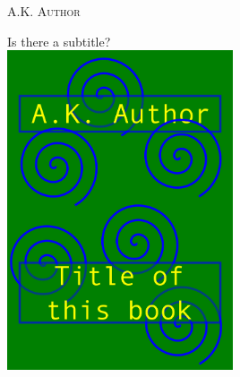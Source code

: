 \begin{titlepage}
	\centering
	\vspace*{1in}
	\LARGE{\textsc{A.K. Author}}\\[12pt]
	
	\Huge{\bookTitle}
	
	\vspace{24pt}
	\Large Is there a subtitle?\\[12pt]
    

    \includegraphics[width=0.5\textwidth]{../photos/cover-title.jpg}
	

\end{titlepage}
